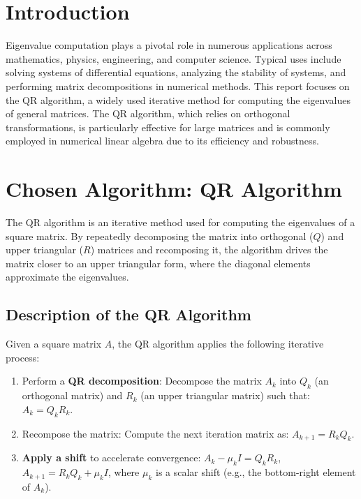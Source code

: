 \documentclass[12pt]{article}
\begin{document}
\section{Introduction}
Eigenvalue computation plays a pivotal role in numerous applications across mathematics, physics, engineering, and computer science. Typical uses include solving systems of differential equations, analyzing the stability of systems, and performing matrix decompositions in numerical methods. This report focuses on the QR algorithm, a widely used iterative method for computing the eigenvalues of general matrices. The QR algorithm, which relies on orthogonal transformations, is particularly effective for large matrices and is commonly employed in numerical linear algebra due to its efficiency and robustness.

\section{Chosen Algorithm: QR Algorithm}

The QR algorithm is an iterative method used for computing the eigenvalues of a square matrix. By repeatedly decomposing the matrix into orthogonal ($Q$) and upper triangular ($R$) matrices and recomposing it, the algorithm drives the matrix closer to an upper triangular form, where the diagonal elements approximate the eigenvalues.

\subsection{Description of the QR Algorithm}

Given a square matrix $A$, the QR algorithm applies the following iterative process:

\begin{enumerate}
    \item Perform a \textbf{QR decomposition}: Decompose the matrix $A_k$ into $Q_k$ (an orthogonal matrix) and $R_k$ (an upper triangular matrix) such that:
    $A_k = Q_k R_k$.

    \item Recompose the matrix: Compute the next iteration matrix as:
    $A_{k+1} = R_k Q_k$.

    \item \textbf{Apply a shift} to accelerate convergence:
    $A_k - \mu_k I = Q_k R_k$, $A_{k+1} = R_k Q_k + \mu_k I$,
    where $\mu_k$ is a scalar shift (e.g., the bottom-right element of $A_k$).
\end{enumerate}
\end{document}
